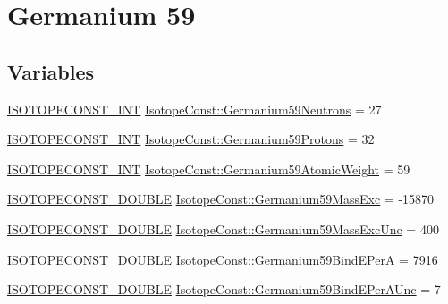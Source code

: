\hypertarget{group___isotope_const-_germanium-_ge59}{}\section{Germanium 59}
\label{group___isotope_const-_germanium-_ge59}
\subsection*{Variables}
\begin{DoxyCompactItemize}
\item 
\mbox{\hyperlink{group___isotope_const-_macros_ga5f18360b3e99483a35c32d789e62621c}{I\+S\+O\+T\+O\+P\+E\+C\+O\+N\+S\+T\+\_\+\+I\+NT}} \mbox{\hyperlink{group___isotope_const-_germanium-_ge59_gab9e57b990c6eb62ba924840c41efb544}{Isotope\+Const\+::\+Germanium59\+Neutrons}} = 27
\item 
\mbox{\hyperlink{group___isotope_const-_macros_ga5f18360b3e99483a35c32d789e62621c}{I\+S\+O\+T\+O\+P\+E\+C\+O\+N\+S\+T\+\_\+\+I\+NT}} \mbox{\hyperlink{group___isotope_const-_germanium-_ge59_gac7d62c281e03c488c5029baa6f666385}{Isotope\+Const\+::\+Germanium59\+Protons}} = 32
\item 
\mbox{\hyperlink{group___isotope_const-_macros_ga5f18360b3e99483a35c32d789e62621c}{I\+S\+O\+T\+O\+P\+E\+C\+O\+N\+S\+T\+\_\+\+I\+NT}} \mbox{\hyperlink{group___isotope_const-_germanium-_ge59_ga223bc645a6ca461b8161aa74be910e77}{Isotope\+Const\+::\+Germanium59\+Atomic\+Weight}} = 59
\item 
\mbox{\hyperlink{group___isotope_const-_macros_ga8f45a7272ce02c0b4c65c44636ed719a}{I\+S\+O\+T\+O\+P\+E\+C\+O\+N\+S\+T\+\_\+\+D\+O\+U\+B\+LE}} \mbox{\hyperlink{group___isotope_const-_germanium-_ge59_ga77020e01345ca0ee6bdb4260b5787bd3}{Isotope\+Const\+::\+Germanium59\+Mass\+Exc}} = -\/15870
\item 
\mbox{\hyperlink{group___isotope_const-_macros_ga8f45a7272ce02c0b4c65c44636ed719a}{I\+S\+O\+T\+O\+P\+E\+C\+O\+N\+S\+T\+\_\+\+D\+O\+U\+B\+LE}} \mbox{\hyperlink{group___isotope_const-_germanium-_ge59_gaae2878bb380be497e98dccbfec50237e}{Isotope\+Const\+::\+Germanium59\+Mass\+Exc\+Unc}} = 400
\item 
\mbox{\hyperlink{group___isotope_const-_macros_ga8f45a7272ce02c0b4c65c44636ed719a}{I\+S\+O\+T\+O\+P\+E\+C\+O\+N\+S\+T\+\_\+\+D\+O\+U\+B\+LE}} \mbox{\hyperlink{group___isotope_const-_germanium-_ge59_ga6a416b4ef25a7304227adbf2c85b2ee2}{Isotope\+Const\+::\+Germanium59\+Bind\+E\+PerA}} = 7916
\item 
\mbox{\hyperlink{group___isotope_const-_macros_ga8f45a7272ce02c0b4c65c44636ed719a}{I\+S\+O\+T\+O\+P\+E\+C\+O\+N\+S\+T\+\_\+\+D\+O\+U\+B\+LE}} \mbox{\hyperlink{group___isotope_const-_germanium-_ge59_gaf15f6af0edf608113c847d14a10f794a}{Isotope\+Const\+::\+Germanium59\+Bind\+E\+Per\+A\+Unc}} = 7

\end{DoxyCompactItemize}
